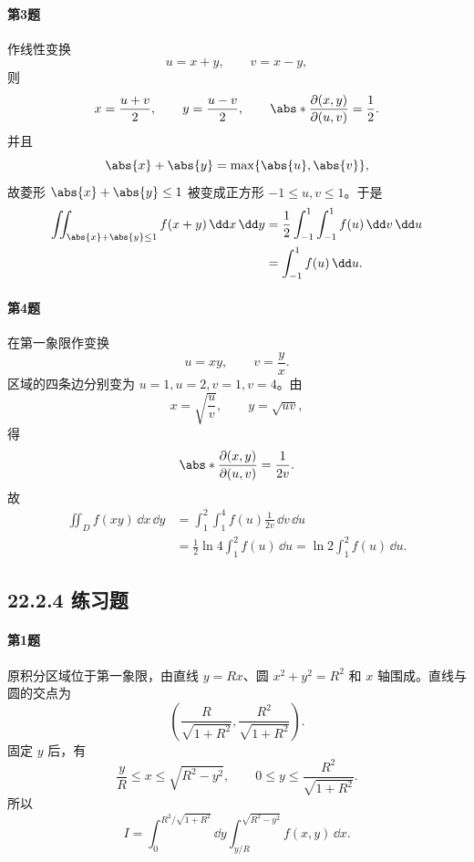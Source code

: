 \paragraph{第3题}
\begin{xsolution}
作线性变换
\[
  u=x+y,\qquad v=x-y,
\]
则
\[
  x=\frac{u+v}{2},\qquad y=\frac{u-v}{2},\qquad
  \abs*{\frac{\partial(x,y)}{\partial(u,v)}}=\frac12.
\]
并且
\[
  \abs{x}+\abs{y}=\max\{\abs{u},\abs{v}\},
\]
故菱形 $\abs{x}+\abs{y}\le1$ 被变成正方形 $-1\le u,v\le1$。于是
\begin{align*}
  \iint_{\abs{x}+\abs{y}\le1}f(x+y)\,\dd x\,\dd y
  &=\frac12\int_{-1}^1\int_{-1}^1 f(u)\,\dd v\,\dd u\\
  &=\int_{-1}^1f(u)\,\dd u.
\end{align*}
\end{xsolution}

\paragraph{第4题}
\begin{xsolution}
在第一象限作变换
\[
  u=xy,\qquad v=\frac yx.
\]
区域的四条边分别变为 $u=1,u=2,v=1,v=4$。由
\[
  x=\sqrt{\frac uv},\qquad y=\sqrt{uv},
\]
得
\[
  \abs*{\frac{\partial(x,y)}{\partial(u,v)}}=\frac1{2v}.
\]
故
\begin{align*}
  \iint_Df(xy)\,\dd x\,\dd y
  &=\int_1^2\int_1^4 f(u)\frac1{2v}\,\dd v\,\dd u\\
  &=\frac12\ln4\int_1^2f(u)\,\dd u
  =\ln2\int_1^2f(u)\,\dd u.
\end{align*}
\end{xsolution}

\subsection*{22.2.4 练习题}

\paragraph{第1题}
\begin{xsolution}
原积分区域位于第一象限，由直线 $y=Rx$、圆 $x^2+y^2=R^2$ 和 $x$ 轴围成。直线与圆的交点为
\[
  \left(\frac{R}{\sqrt{1+R^2}},\frac{R^2}{\sqrt{1+R^2}}\right).
\]
固定 $y$ 后，有
\[
  \frac yR\le x\le\sqrt{R^2-y^2},
  \qquad0\le y\le\frac{R^2}{\sqrt{1+R^2}}.
\]
所以
\[
  \boxed{
  I=\int_0^{R^2/\sqrt{1+R^2}}\dd y
  \int_{y/R}^{\sqrt{R^2-y^2}}f(x,y)\,\dd x }.
\]
\end{xsolution}

